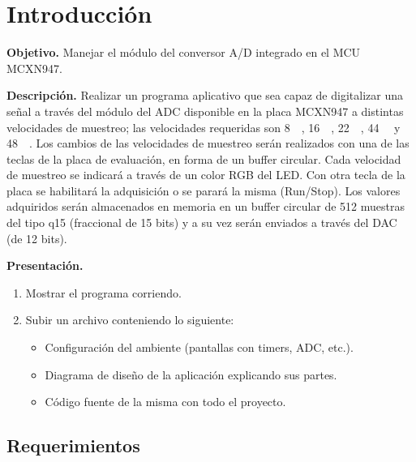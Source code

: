 \documentclass[11pt,a4paper]{article}
\begin{document}
\caratula
\setcounter{tocdepth}{2}
\tableofcontents
\clearpage

\section{Introducción}

\begin{consigna}
\textbf{Objetivo.} Manejar el módulo del conversor A/D integrado en el MCU
MCXN947.

\textbf{Descripción.} Realizar un programa aplicativo que sea capaz de
digitalizar una señal a través del módulo del ADC disponible en la placa
MCXN947 a distintas velocidades de muestreo; las velocidades requeridas son
\qty{8}{\kilo\sps}, \qty{16}{\kilo\sps}, \qty{22}{\kilo\sps},
\qty{44}{\kilo\sps} y \qty{48}{\kilo\sps}. Los cambios de las velocidades de
muestreo serán realizados con una de las teclas de la placa de evaluación, en
forma de un buffer circular. Cada velocidad de muestreo se indicará a través
de un color RGB del LED. Con otra tecla de la placa se habilitará la
adquisición o se parará la misma (Run/Stop). Los valores adquiridos serán
almacenados en memoria en un buffer circular de 512 muestras del tipo q15
(fraccional de 15 bits) y a su vez serán enviados a través del DAC (de
12 bits).

\textbf{Presentación.}
\begin{enumerate}[nosep,leftmargin=*]
  \item Mostrar el programa corriendo.
  \item Subir un archivo conteniendo lo siguiente:
  \begin{itemize}[nosep]
    \item Configuración del ambiente (pantallas con timers, ADC, etc.).
    \item Diagrama de diseño de la aplicación explicando sus partes.
    \item Código fuente de la misma con todo el proyecto.
  \end{itemize}
\end{enumerate}
\end{consigna}

\subsection{Requerimientos}
\end{document}
